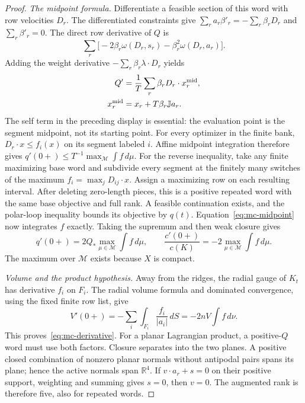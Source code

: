\begin{proof}
\emph{The midpoint formula.}
Differentiate a feasible section of this word with row velocities $D_r$.
The differentiated constraints give
$\sum_ra_r\beta'_r=-\sum_r\beta_rD_r$ and $\sum_r\beta'_r=0$.
The direct row derivative of $Q$ is
\[
 \sum_r\bigl[-2\beta_r\omega(D_r,s_r)
              -\beta_r^2\omega(D_r,a_r)\bigr].
\]
Adding the weight derivative $-\sum_r\beta_r\lambda\cdot D_r$ yields
\begin{equation}\label{eq:mc-midpoint}
 \begin{aligned}
 Q'&=\frac1T\sum_r\beta_rD_r\cdot x_r^{\rm mid},\\
 x_r^{\rm mid}&=x_r+T\beta_r\mathbb{J}a_r.
 \end{aligned}
\end{equation}
The self term in the preceding display is essential: the evaluation point
is the segment midpoint, not its starting point.
For every optimizer in the finite bank, $D_r\cdot x\leq f_i(x)$ on its
segment labeled $i$. Affine midpoint integration therefore gives
$q'(0+)\leq T^{-1}\max_{\mathcal M}\int f\,d\mu$.
For the reverse inequality, take any finite maximizing base word and
subdivide every segment at the finitely many switches of the maximum
$f_i=\max_jD_{ij}\cdot x$. Assign a maximizing row on each resulting interval.
After deleting zero-length pieces, this is a positive repeated word with the
same base objective and full rank. A feasible continuation exists, and the
polar-loop inequality bounds its objective by $q(t)$.
Equation~\eqref{eq:mc-midpoint} now integrates $f$ exactly. Taking the supremum
and then weak closure gives
\[
 q'(0+)=2Q_*\max_{\mu\in\mathcal M}\int f\,d\mu,
 \qquad \frac{c'(0+)}{c(K)}=-2\max_{\mu\in\mathcal M}\int f\,d\mu.
\]
The maximum over $\mathcal M$ exists because $X$ is compact.

\emph{Volume and the product hypothesis.}
Away from the ridges, the radial gauge of $K_t$ has derivative $f_i$ on
$F_i$. The radial volume formula and dominated convergence, using the fixed
finite row list, give
\[
 V'(0+)=-\sum_i\int_{F_i}\frac{f_i}{|a_i|}\,dS
        =-2nV\int f\,d\nu.
\]
This proves~\eqref{eq:mc-derivative}.
For a planar Lagrangian product, a positive-$Q$ word must use both factors.
Closure separates into the two planes. A positive closed combination of
nonzero planar normals without antipodal pairs spans its plane; hence the
active normals span $\mathbb R^4$. If $v\cdot a_r+s=0$ on their positive
support, weighting and summing gives $s=0$, then $v=0$. The augmented rank is
therefore five, also for repeated words.
\end{proof}

